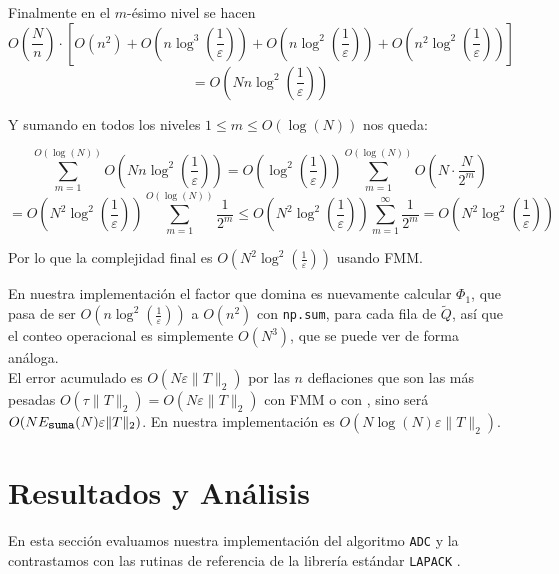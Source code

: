 \documentclass[11pt,a4paper]{article}
\newcommand{\Sum}{\sum\limits}
\begin{document}
Finalmente en el $m$-ésimo nivel se hacen $$O\left(\frac Nn\right) \cdot \left[O(n^2)+O\left(n \log^3\left(\frac1\varepsilon\right)\right)+O\left(n\log^2\left(\frac1\varepsilon\right)\right)+ O\left(n^2\log^2\left(\frac1\varepsilon\right)\right)\right]$$
$$=O\left(Nn\log^2\left(\frac1\varepsilon\right)\right)$$

Y sumando en todos los niveles $1\leq m \leq O(\log(N))$ nos queda:

$$\Sum_{m=1}^{O(\log(N))} O\left(Nn\log^2\left(\frac1\varepsilon\right)\right) = O\left(\log^2\left( \frac1\varepsilon\right)\right)\Sum_{m=1}^{O(\log(N))} O\left(N\cdot \frac N{2^m}\right)$$
$$= O\left(N^2\log^2\left( \frac1\varepsilon\right)\right)\Sum_{m=1}^{O(\log(N))} \frac1{2^m} \leq  O\left(N^2\log^2\left( \frac1\varepsilon\right)\right)\Sum_{m=1}^{\infty} \frac1 {2^m} = O\left(N^2\log^2\left( \frac1\varepsilon\right)\right)$$

Por lo que la complejidad final es $O\left(N^2\log^2\left( \frac1\varepsilon\right)\right)$ usando FMM.

En nuestra implementación el factor que domina es nuevamente calcular $\Phi_1$, que pasa de ser $O\left(n\log^2\left( \frac1\varepsilon\right)\right)$ a $O\left(n^2\right)$ con \texttt{np.sum}, para cada fila de $\tilde Q$, así que el conteo operacional es simplemente $O(N^3)$, que se puede ver de forma análoga.\\
    El error acumulado es $O(N\varepsilon \|T\|_2)$ por las $n$ deflaciones que son las más pesadas $O(\tau \|T\|_2)= O(N\varepsilon \|T\|_2)$ con FMM o con \cite{ExactSum}, sino será $O(N E_{\texttt{\small suma}}(N) \varepsilon \|T\|_2)$. En nuestra implementación es $O(N \log(N) \varepsilon \|T\|_2)$.








 


\section{Resultados y Análisis}

En esta sección evaluamos nuestra implementación del algoritmo \texttt{ADC} y la contrastamos con las rutinas de referencia de la librería estándar \texttt{LAPACK} \cite{lapack}.
\end{document}
